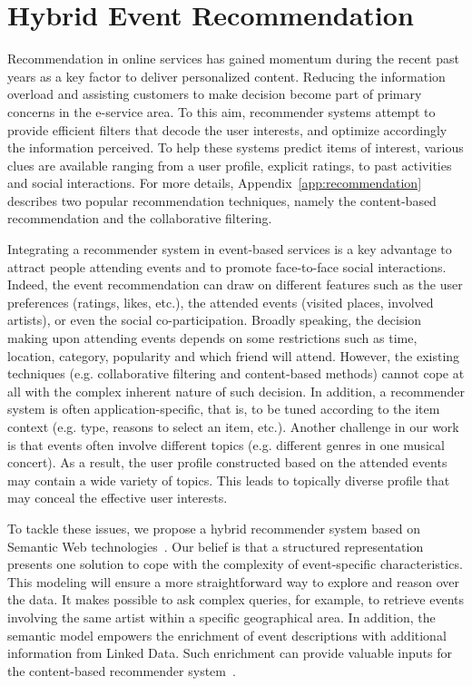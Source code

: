 \chapter{Hybrid Event Recommendation}    \label{ch:recommendation}
\graphicspath{{Part2/Chapter2/figures/}}

Recommendation in online services has gained momentum during the recent past years as a key factor to deliver personalized content. Reducing the information overload and assisting customers to make decision become part of primary concerns in the e-service area. To this aim, recommender systems attempt to provide efficient filters that decode the user interests, and optimize accordingly the information perceived. To help these systems predict items of interest, various clues are available ranging from a user profile, explicit ratings, to past activities and social interactions. For more details, Appendix~\ref{app:recommendation} describes two popular recommendation techniques, namely the content-based recommendation and the collaborative filtering.

Integrating a recommender system in event-based services is a key advantage to attract people attending events and to promote face-to-face social interactions. Indeed, the event recommendation can draw on different features such as the user preferences (ratings, likes, etc.), the attended events (visited places, involved artists), or even the social co-participation. Broadly speaking, the decision making upon attending events depends on some restrictions such as time, location, category, popularity and which friend will attend. However, the existing techniques (e.g. collaborative filtering and content-based methods) cannot cope at all with the complex inherent nature of such decision. In addition, a recommender system is often application-specific, that is, to be tuned according to the item context (e.g. type, reasons to select an item, etc.). Another challenge in our work is that events often involve different topics (e.g. different genres in one musical concert). As a result, the user profile constructed based on the attended events may contain a wide variety of topics. This leads to topically diverse profile that may conceal the effective user interests. 

To tackle these issues, we propose a hybrid recommender system based on Semantic Web technologies~\cite{Khrouf:RecSys2013}. Our belief is that a structured representation presents one solution to cope with the complexity of event-specific characteristics. This modeling will ensure a more straightforward way to explore and reason over the data. It makes possible to ask complex queries, for example, to retrieve events involving the same artist within a specific geographical area. In addition, the semantic model empowers the enrichment of event descriptions with additional information from Linked Data. Such enrichment can provide valuable inputs for the content-based recommender system~\cite{DiNoia:SEMANTICS12}.

